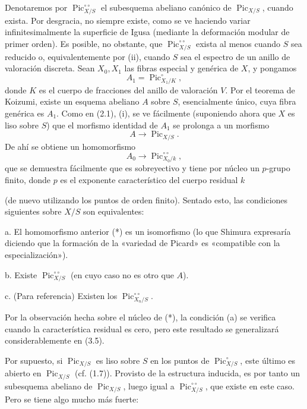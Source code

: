  Denotaremos por
$\operatorname{Pic}_{X/S}^{\circ\circ}$ el subesquema abeliano canónico de
$\operatorname{Pic}_{X/S}$, cuando exista. Por desgracia, no siempre existe,
como se ve haciendo variar infinitesimalmente la superficie de Igusa (mediante
la deformación modular de primer orden). Es posible, no obstante, que
$\operatorname{Pic}_{X/S}^{\circ\circ}$ exista al menos cuando $S$ sea reducido
o, equivalentemente por (ii), cuando $S$ sea el espectro de un anillo de
valoración discreta. Sean $X_0,X_1$ las fibras especial y genérica de $X$, y
pongamos
\[
A_1=\operatorname{Pic}_{X_1/K}^\circ,
\]
donde $K$ es el cuerpo de fracciones del anillo de valoración $V$. Por el
teorema de Koizumi, existe un esquema abeliano $A$ sobre $S$, esencialmente
único, cuya fibra genérica es $A_1$. Como en (2.1), (i), se ve fácilmente
(suponiendo ahora que $X$ es liso sobre $S$) que el morfismo identidad de $A_1$
se prolonga a un morfismo
\[
A\longrightarrow\operatorname{Pic}_{X/S}.
\]
De ahí se obtiene un homomorfismo
\[
\tag{*}A_0\longrightarrow\operatorname{Pic}_{X_0/k}^{\circ\circ},
\]
que se demuestra fácilmente que es sobreyectivo y tiene por núcleo un
$p$-grupo finito, donde $p$ es el exponente característico del cuerpo residual
$k$

(de nuevo utilizando los puntos de orden finito). Sentado esto, las condiciones
siguientes sobre $X/S$ son equivalentes:

\medskip
\noindent a. El homomorfismo anterior (*) es un isomorfismo (lo que Shimura
expresaría diciendo que la formación de la «variedad de Picard» es «compatible
con la especialización»).

\noindent b. Existe $\operatorname{Pic}_{X/S}^{\circ\circ}$ (en cuyo caso no es
otro que $A$).

\noindent c. (Para referencia) Existen los
$\operatorname{Pic}_{X_n/S}^{\circ\circ}$.

Por la observación hecha sobre el núcleo de (*), la condición (a) se verifica
cuando la característica residual es cero, pero este resultado se generalizará
considerablemente en (3.5).

Por supuesto, si $\operatorname{Pic}_{X/S}$ es liso sobre $S$ en los puntos de
$\operatorname{Pic}_{X/S}^\circ$, este último es abierto en
$\operatorname{Pic}_{X/S}$ (cf. (1.7)). Provisto de la estructura inducida, es
por tanto un subesquema abeliano de $\operatorname{Pic}_{X/S}$, luego igual a
$\operatorname{Pic}_{X/S}^{\circ\circ}$, que existe en este caso. Pero se tiene
algo mucho más fuerte:

